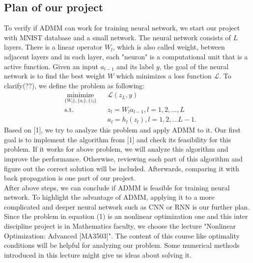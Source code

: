 \documentclass[11pt]{report}
\begin{document}
\subsection*{Plan of our project}
To verify if ADMM can work for training neural network, we start our project with MNIST database and a small network. The neural network consists of $L$ layers. There is a linear operator $W_l$, which is also called weight, between adjacent layers and in each layer, each "neuron" is a computational unit that is a active function. Given an input $a_{l-1}$ and its label $y$, the goal of the neural network is to find the best weight $W$ which minimizes a loss function $\mathcal{L}$. To clarify(??), we define the problem as following:
\begin{equation}
\begin{aligned}
& \underset{\{W_l\},\{a_l\}, \{z_l\}}{\text{minimize}}
& & \mathcal{L}(z_L,y) \\
& \text{s.t.}
& & z_l = W_la_{l-1},  l = 1,2,...,L \\
& & & a_l = h_l(z_l),  l = 1,2,...L-1.
\end{aligned}
\end{equation}
Based on [1], we try to analyze this problem and apply ADMM to it. Our first goal is to implement the algorithm from [1] and check its feasibility for this problem. If it works for above problem, we will  analyze this algorithm and  improve the performance. Otherwise, reviewing each part of this algorithm and figure out the correct solution will be included. Afterwards, comparing it with back propagation is one part of our project.\\
After above steps, we can conclude if ADMM is feasible for training neural network. To highlight the advantage of ADMM, applying it to a more complicated and deeper neural network such as CNN or RNN is our further plan.\\
Since the problem in equation (1) is an nonlinear optimization one and this inter discipline project is in Mathematics faculty, we choose the lecture "Nonlinear Optimization: Advanced [MA3503]". The content of this course like optimality conditions will be helpful for analyzing our problem. Some numerical methods introduced in this lecture might give us ideas about solving it.
\end{document}
